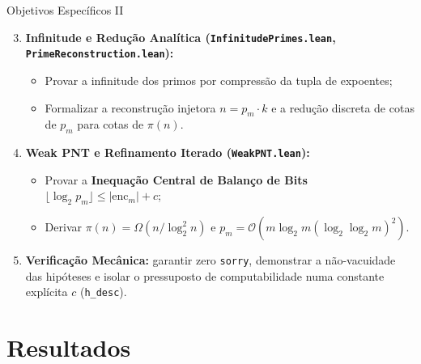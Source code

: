 \documentclass[10pt, aspectratio=43]{beamer}
\begin{document}
\begin{frame}{Objetivos Específicos II}
\begin{enumerate}
    \setcounter{enumi}{2}
    \item \textbf{Infinitude e Redução Analítica (\texttt{InfinitudePrimes.lean}, \texttt{PrimeReconstruction.lean}):}
    \begin{itemize}
        \item Provar a infinitude dos primos por compressão da tupla de expoentes;
        \item Formalizar a reconstrução injetora $n = p_m \cdot k$ e a redução discreta de cotas de $p_m$ para cotas de $\pi(n)$.
    \end{itemize}
    \medskip
    \item \textbf{Weak PNT e Refinamento Iterado (\texttt{WeakPNT.lean}):}
    \begin{itemize}
        \item Provar a \textbf{Inequação Central de Balanço de Bits} $\lfloor\log_2 p_m\rfloor \le |\text{enc}_m| + c$;
        \item Derivar $\pi(n) = \Omega(n/\log_2^2 n)$ e $p_m = \mathcal{O}(m \log_2 m (\log_2\log_2 m)^2)$.
    \end{itemize}
    \medskip
    \item \textbf{Verificação Mecânica:} garantir zero \texttt{sorry}, demonstrar a não-vacuidade das hipóteses e isolar o pressuposto de computabilidade numa constante explícita $c$ (\texttt{h\_desc}).
\end{enumerate}
\end{frame}

\section{Resultados}
\end{document}
